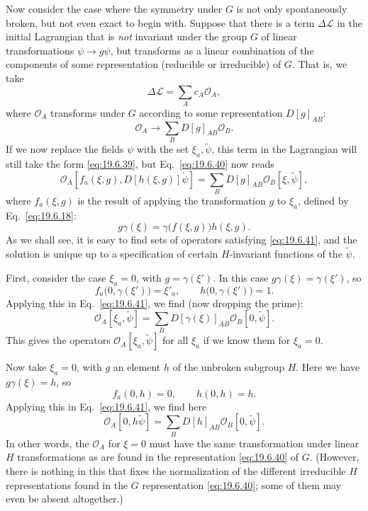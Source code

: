 Now consider the case where the symmetry under $G$ is not only spontaneously broken, but not even exact to begin with. Suppose that there is a term $\Delta\mathcal L$ in the initial Lagrangian that is \emph{not} invariant under the group $G$ of linear transformations $\psi\to g\psi$, but transforms as a linear combination of the components of some representation (reducible or irreducible) of $G$. That is, we take
\begin{equation}
\Delta\mathcal L=\sum_Ac_A\mathcal O_A,
\tag{19.6.39}\label{eq:19.6.39}
\end{equation}
where $\mathcal O_A$ transforms under $G$ according to some representation $D[g]_{AB}$:
\begin{equation}
\mathcal O_A\longrightarrow\sum_BD[g]_{AB}\mathcal O_B.
\tag{19.6.40}\label{eq:19.6.40}
\end{equation}
If we now replace the fields $\psi$ with the set $\xi_a,\widetilde\psi$, this term in the Lagrangian will still take the form \eqref{eq:19.6.39}, but Eq.~\eqref{eq:19.6.40} now reads
\begin{equation}
\mathcal O_A\left[
f_a(\xi,g),D[h(\xi,g)]\widetilde\psi
\right]
=\sum_BD[g]_{AB}\mathcal O_B[\xi,\widetilde\psi],
\tag{19.6.41}\label{eq:19.6.41}
\end{equation}
where $f_a(\xi,g)$ is the result of applying the transformation $g$ to $\xi_a$, defined by Eq.~\eqref{eq:19.6.18}:
\begin{equation}
g\gamma(\xi)=\gamma\bigl(f(\xi,g)\bigr)h(\xi,g).
\tag{19.6.42}\label{eq:19.6.42}
\end{equation}
As we shall see, it is easy to find sets of operators satisfying \eqref{eq:19.6.41}, and the solution is unique up to a specification of certain $H$-invariant functions of the $\widetilde\psi$.

First, consider the case $\xi_a=0$, with $g=\gamma(\xi')$. In this case $g\gamma(\xi)=\gamma(\xi')$, so
\[
f_a\bigl(0,\gamma(\xi')\bigr)=\xi'_a,
\qquad
h\bigl(0,\gamma(\xi')\bigr)=1.
\]
Applying this in Eq.~\eqref{eq:19.6.41}, we find (now dropping the prime):
\begin{equation}
\mathcal O_A[\xi_a,\widetilde\psi]
=\sum_BD[\gamma(\xi)]_{AB}\mathcal O_B[0,\widetilde\psi].
\tag{19.6.43}\label{eq:19.6.43}
\end{equation}
This gives the operators $\mathcal O_A[\xi_a,\widetilde\psi]$ for all $\xi_a$ if we know them for $\xi_a=0$.

Now take $\xi_a=0$, with $g$ an element $h$ of the unbroken subgroup $H$. Here we have $g\gamma(\xi)=h$, so
\[
f_a(0,h)=0,
\qquad
h(0,h)=h.
\]
Applying this in Eq.~\eqref{eq:19.6.41}, we find here
\begin{equation}
\mathcal O_A[0,h\widetilde\psi]
=\sum_BD[h]_{AB}\mathcal O_B[0,\widetilde\psi].
\tag{19.6.44}\label{eq:19.6.44}
\end{equation}
In other words, the $\mathcal O_A$ for $\xi=0$ must have the same transformation under linear $H$ transformations as are found in the representation \eqref{eq:19.6.40} of $G$. (However, there is nothing in this that fixes the normalization of the different irreducible $H$ representations found in the $G$ representation \eqref{eq:19.6.40}; some of them may even be absent altogether.)

